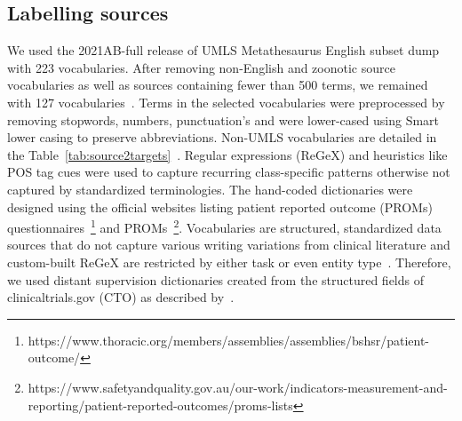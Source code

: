 \documentclass[10.7pt,]{article}
\begin{document}
\subsection{Labelling sources}\label{lss}
%
We used the 2021AB-full release of UMLS Metathesaurus English subset dump with 223 vocabularies.
After removing non-English and zoonotic source vocabularies as well as sources containing fewer than 500 terms, we remained with 127 vocabularies~\cite{humphreys1998unified}.
Terms in the selected vocabularies were preprocessed by removing stopwords, numbers, punctuation's and were lower-cased using Smart lower casing to preserve abbreviations.
Non-UMLS vocabularies are detailed in the Table~\ref{tab:source2targets}~\cite{schriml2012disease,robinson2008human,he2014oae,de2010chemical,lin2020cto,kronk2020development,geifman2011towards,rogier2021using,lin2018cancer,mohammed2012building,ninot2018definition}.
Regular expressions (ReGeX) and heuristics like POS tag cues were used to capture recurring class-specific patterns otherwise not captured by standardized terminologies.
The hand-coded dictionaries were designed using the official websites listing patient reported outcome (PROMs) questionnaires~\footnote{https://www.thoracic.org/members/assemblies/assemblies/bshsr/patient-outcome/} and PROMs~\footnote{https://www.safetyandquality.gov.au/our-work/indicators-measurement-and-reporting/patient-reported-outcomes/proms-lists}.
Vocabularies are structured, standardized data sources that do not capture various writing variations from clinical literature and custom-built ReGeX are restricted by either task or even entity type~\cite{ratner2017snorkel,safranchik2020weakly}.
Therefore, we used distant supervision dictionaries created from the structured fields of clinicaltrials.gov (CTO) as described by~\cite{dhrangadhariya2022distant}.
\end{document}
